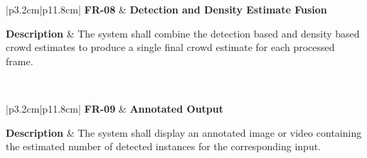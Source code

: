 
\begin{table}[H]
	\centering
	\renewcommand{\arraystretch}{1.25}
	\begin{tabular}{|p{3.2cm}|p{11.8cm}|}
		\hline
		\textbf{FR-08} &
		\textbf{Detection and Density Estimate Fusion} \\ \hline
		
		\textbf{Description} &
		The system shall combine the detection based and density based crowd estimates to produce a single final crowd estimate for each processed frame. \\ \hline
		
		 \\ \hline
	\end{tabular}
	\caption{Functional requirement for detection and density estimate fusion.}
	\label{tab:fr08}
\end{table}


\begin{table}[H]
	\centering
	\renewcommand{\arraystretch}{1.25}
	\begin{tabular}{|p{3.2cm}|p{11.8cm}|}
		\hline
		\textbf{FR-09} &
		\textbf{Annotated Output} \\ \hline
		
		\textbf{Description} &
		The system shall display an annotated image or video containing the estimated number of detected instances for the corresponding input. \\ \hline
		
		 \\ \hline
	\end{tabular}
	\caption{Functional requirement for annotated output.}
	\label{tab:fr09}
\end{table}

